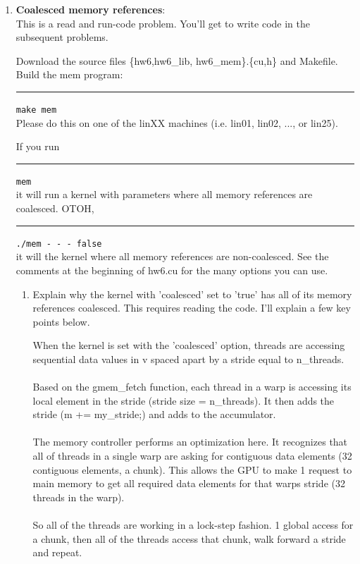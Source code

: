 \documentclass{article}
\newenvironment{answer}
{\par\color{blue}}
{\normalfont\par}
\begin{document}
\begin{enumerate}
          \clearpage
    \item \textbf{Coalesced memory references}:\\
          This is a read and run-code problem. You'll get to write code in the subsequent
          problems.
          \par
          Download the source files \{hw6,hw6\_lib, hw6\_mem\}.\{cu,h\} and Makefile. Build the
          mem program:\\
          \rule{1.5em}{0ex}\texttt{make mem}\\
          Please do this on one of the linXX machines (i.e. lin01, lin02, ..., or lin25).
          \par
          If you run\\
          \rule{1.5em}{0ex}\texttt{mem}\\
          it will run a kernel with parameters where all memory references are coalesced.
          OTOH,\\
          \rule{1.5em}{0ex}\texttt{./mem - - - false}\\
          it will the kernel where all memory references are non-coalesced. See the
          comments at the beginning of hw6.cu for the many options you can use.

          \begin{enumerate}
              \item Explain why the kernel with 'coalesced' set to 'true' has all of its
                    memory references coalesced. This requires reading the code. I'll explain
                    a few key points below.

                    \begin{answer}
                        When the kernel is set with the 'coalesced' option, threads are accessing sequential data values in v spaced
                        apart by a stride equal to n\_threads.
                        \\ \\
                        Based on the gmem\_fetch function, each thread in a warp is accessing its local element in the stride
                        (stride size = n\_threads). It then adds the stride (m += my\_stride;) and adds to the accumulator.
                        \\ \\
                        The memory controller performs an optimization here. It recognizes that all of threads in a single warp
                        are asking for contiguous data elements (32 contiguous elements, a chunk). This allows the GPU to
                        make 1 request to main memory to get all required data elements for that warps stride (32 threads in the warp).
                        \\ \\
                        So all of the threads are working in a lock-step fashion. 1 global access for a chunk, then all of the threads
                        access that chunk, walk forward a stride and repeat.
                    \end{answer}


\end{enumerate}
\end{enumerate}
\end{document}
